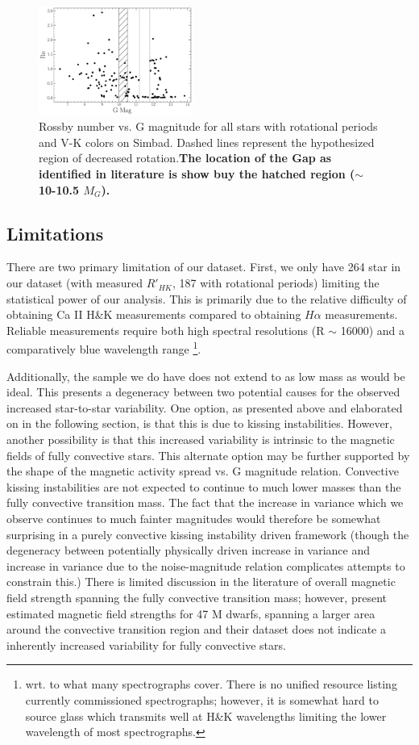 \begin{figure}
  \centering
  \includegraphics[width=0.45\textwidth]{figures/Rossby.pdf}
  \caption{Rossby number vs. G magnitude for all stars with rotational periods
  and V-K colors on Simbad. Dashed lines represent the hypothesized region of decreased rotation.\textbf{The location of the Gap
  as identified in literature is show buy the hatched region ($\sim$ 10-10.5 $M_{G}$).}}
  \label{fig:rossby}
\end{figure}


\subsection{Limitations}
There are two primary limitation of our dataset. First, we only have 264 star
in our dataset (with measured $R'_{HK}$, 187 with rotational periods) limiting
the statistical power of our analysis. This is primarily due to the relative
difficulty of obtaining Ca II H\&K measurements compared to obtaining $H\alpha$
measurements. Reliable measurements require both high spectral resolutions (R
$\sim$ 16000) and a comparatively blue wavelength range \footnote{wrt. to what
many spectrographs cover. There is no unified resource listing currently
commissioned spectrographs; however, it is somewhat hard to source glass which
transmits well at H\&K wavelengths limiting the lower wavelength of most
spectrographs.}.

Additionally, the sample we do have does not extend to as low mass as would be
ideal. This presents a degeneracy between two potential causes for the observed
increased star-to-star variability. One option, as presented above and
elaborated on in the following section, is that this is due to kissing
instabilities. However, another possibility is that this increased variability
is intrinsic to the magnetic fields of fully convective stars. This alternate
option may be further supported by the shape of the magnetic activity spread vs.
G magnitude relation. Convective kissing instabilities are not expected to
continue to much lower masses than the fully convective transition mass. The
fact that the increase in variance which we observe continues to much fainter
magnitudes would therefore be somewhat surprising in a purely convective kissing
instability driven framework (though the degeneracy between potentially
physically driven increase in variance and increase in variance due to the
noise-magnitude relation complicates attempts to constrain this.) There is
limited discussion in the literature of overall magnetic field strength
spanning the fully convective transition mass; however, \citet{Shulyak2019}
present estimated magnetic field strengths for 47 M dwarfs, spanning a larger
area around the convective transition region and their dataset does not
indicate a inherently increased variability for fully convective stars.
